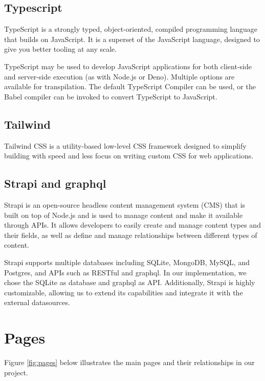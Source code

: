\documentclass[singlecolumn]{article}
\begin{document}
\subsection{Typescript}
TypeScript is a strongly typed, object-oriented, compiled programming language that builds on JavaScript. It is a superset of the JavaScript language, designed to give you better tooling at any scale.


TypeScript may be used to develop JavaScript applications for both client-side and server-side execution (as with Node.js or Deno). Multiple options are available for transpilation. The default TypeScript Compiler can be used, or the Babel compiler can be invoked to convert TypeScript to JavaScript.

\subsection{Tailwind}
Tailwind CSS is a utility-based low-level CSS framework designed to simplify building with speed and less focus on writing custom CSS for web applications.

\subsection{Strapi and graphql}
Strapi is an open-source headless content management system (CMS) that is built on top of Node.js and is used to manage content and make it available through APIs. It allows developers to easily create and manage content types and their fields, as well as define and manage relationships between different types of content.

Strapi supports multiple databases including SQLite, MongoDB, MySQL, and Postgres, and APIs such as RESTful and graphql. In our implementation, we chose the SQLite as database and graphql as API. Additionally, Strapi is highly customizable, allowing us to extend its capabilities and integrate it with the external datasources.


\section{Pages}
Figure \ref{fig:pages} below illustrates the main pages and their relationships in our project. 
\end{document}
